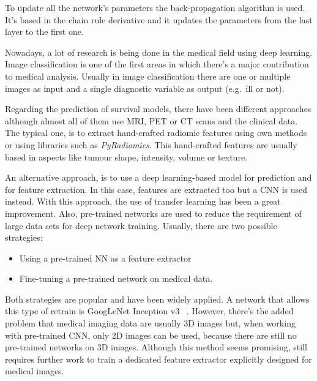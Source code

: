 To update all the network's parameters the back-propagation algorithm is used. It's based
in the chain rule derivative and it updates the parameters from the last layer to the first
one.
~\cite{neural:efficient-backprop}




Nowadays, a lot of research is being done in the medical field using deep learning. Image
classification is one of the first areas in which there's a major contribution to medical analysis.
Usually in image classification there are one or multiple images as input and a single diagnostic 
variable as output (e.g.~ill or not).
~\cite{medical:survey-deep-learning}

Regarding the prediction of survival models, there have been different approaches although
almost all of them use \gls{MRI}, \gls{PET} or \gls{CT} scans and the clinical data. 
The typical one, is to extract hand-crafted radiomic features using own methods or using 
libraries such as \emph{PyRadiomics}. This 
hand-crafted features are usually based in aspects like tumour shape, intensity, volume or texture.
~\cites{medical:tumour-radiomics}{medical:py-radiomics}{medical:computational-radiomics}

An alternative approach, is to use a deep learning-based model for prediction and for feature
extraction. In this case, features are extracted too but a \gls{CNN} 
is used instead. With this approach, the use of transfer learning has been a
great improvement. Also, pre-trained networks are used to reduce the requirement of large data
sets for deep network training. Usually, there are two possible strategies: 
\begin{itemize}
  \item Using a pre-trained NN as a feature extractor
  \item Fine-tuning a pre-trained network on medical data.
\end{itemize}

Both strategies are popular and have been widely applied. A network that allows this type
of retrain is GoogLeNet Inception v3
~\cites{neural:goog-le-net}{neural:retrain}{neural:inception-retrain}.
However, there's the added problem that medical imaging data are usually 3D images but, 
when working with pre-trained \gls{CNN}, only 2D images can be used, because there are still no 
pre-trained networks on 3D images. Although this method seems promising, still requires 
further work to train a dedicated feature extractor explicitly designed for medical images.
~\cite{medical:deep-learning-radiomics-gbm}

